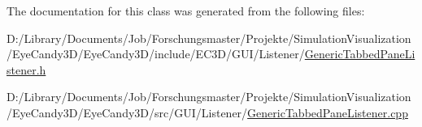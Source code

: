 The documentation for this class was generated from the following files\+:\begin{DoxyCompactItemize}
\item 
D\+:/\+Library/\+Documents/\+Job/\+Forschungsmaster/\+Projekte/\+Simulation\+Visualization/\+Eye\+Candy3\+D/\+Eye\+Candy3\+D/include/\+E\+C3\+D/\+G\+U\+I/\+Listener/\mbox{\hyperlink{_generic_tabbed_pane_listener_8h}{Generic\+Tabbed\+Pane\+Listener.\+h}}\item 
D\+:/\+Library/\+Documents/\+Job/\+Forschungsmaster/\+Projekte/\+Simulation\+Visualization/\+Eye\+Candy3\+D/\+Eye\+Candy3\+D/src/\+G\+U\+I/\+Listener/\mbox{\hyperlink{_generic_tabbed_pane_listener_8cpp}{Generic\+Tabbed\+Pane\+Listener.\+cpp}}\end{DoxyCompactItemize}
